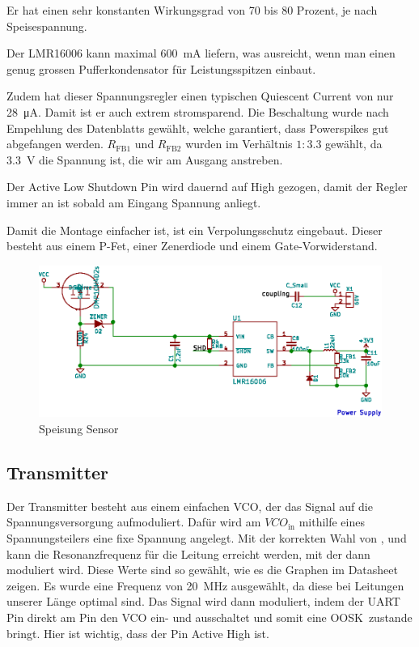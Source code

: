 Er  hat einen  sehr konstanten  Wirkungsgrad von  70 bis  80 Prozent,  je nach
Speisespannung.

Der LMR16006 kann maximal \SI{600}{\milli\ampere} liefern, was ausreicht, wenn
man einen genug grossen Pufferkondensator f\"ur Leistungsspitzen einbaut.

Zudem  hat  dieser  Spannungsregler  einen  typischen  Quiescent  Current  von
nur  \SI{28}{\micro\ampere}. Damit  ist  er  auch  extrem  stromsparend.   Die
Beschaltung  wurde  nach   Empehlung  des  Datenblatts  \cite{ref:ti:lmr16006}
gew\"ahlt,  welche   garantiert,  dass  Powerspikes  gut   abgefangen  werden.
$R_{\mathrm{FB1}}$  und  $R_{\mathrm{FB2}}$  wurden  im  Verh\"altnis  $1:3.3$
gew\"ahlt, da \SI{3.3}{\volt} die Spannung ist, die wir am Ausgang anstreben.

Der Active  Low Shutdown Pin wird  dauernd auf High gezogen,  damit der Regler
immer an ist sobald am Eingang Spannung anliegt.

Damit die  Montage einfacher  ist, ist ein  Verpolungsschutz eingebaut. Dieser
besteht aus einem P-Fet, einer Zenerdiode und einem Gate-Vorwiderstand.

\begin{figure}[h!t]
    \centering
    \includegraphics[width=1\textwidth]{images/sensor-sch/sensor--sch--supply.eps}
    \caption[Sensor: Schema Speisung]{Speisung Sensor}
\end{figure}


\subsection{Transmitter}
\label{subsec:hw:sensor:transmitter}

Der  Transmitter  besteht  aus  einem   einfachen  VCO,  der  das  Signal  auf
die  Spannungsversorgung aufmoduliert.   Daf\"ur  wird am  $VCO_{\mathrm{in}}$
mithilfe eines Spannungsteilers eine fixe Spannung angelegt. Mit der korrekten
Wahl von ,   und  kann  die Resonanzfrequenz f\"ur
die Leitung erreicht werden, mit der  dann moduliert wird. Diese Werte sind so
gew\"ahlt, wie es die Graphen  im Datasheet  zeigen. Es
wurde  eine  Frequenz  von  \SI{20}{\mega\hertz} ausgew\"ahlt,  da  diese  bei
Leitungen unserer  L\"ange optimal sind.  Das  Signal wird dann
moduliert, indem der UART  Pin  direkt am  Pin den VCO ein-
und ausschaltet und  somit eine OOSK zustande bringt. Hier  ist wichtig, dass
der Pin Active High ist.

